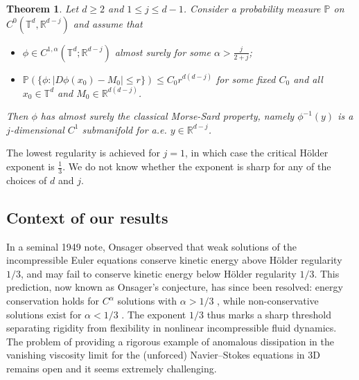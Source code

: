 \documentclass[11pt,reqno]{amsart}
\newtheorem{theorem}{Theorem}[section]
\theoremstyle{definition}
\numberwithin{equation}{section}
\begin{document}
\begin{theorem}\label{t:classical-Morse-Sard}
Let $d\geq 2$ and $1\leq j \leq d-1$. Consider a probability measure $\mathbb P$ on $C^0 (\mathbb T^d, \mathbb R^{d-j})$ and assume that 
\begin{itemize}
\item[(a)] $\phi \in C^{1,\alpha} (\mathbb{T}^d; \mathbb{R}^{d-j})$ almost surely for some $\alpha>\frac{j}{2+j}$;
\item[(b)] $\mathbb P (\{\phi : |D\phi (x_0) - M_0| \leq r \}) \leq C_0 r^{d(d-j)}$ for some fixed $C_0$ and all $x_0\in \mathbb T^d$ and $M_0 \in \mathbb R^{d(d-j)}$.
\end{itemize}
Then $\phi$ has almost surely the classical Morse-Sard property, namely $\phi^{-1} (y)$ is a $j$-dimensional $C^1$ submanifold for a.e. $y\in \mathbb R^{d-j}$. 
\end{theorem}

The lowest regularity is achieved for $j=1$, in which case the critical H\"older exponent is $\frac{1}{3}$. We do not know whether the exponent is sharp for any of the choices of $d$ and $j$.

\subsection{Context of our results} In a seminal 1949 note, Onsager \cite{Onsager1949} observed that weak solutions of the incompressible Euler equations conserve kinetic energy above H\"older regularity $1/3$, and may fail to conserve kinetic energy below H\"older regularity $1/3$. This prediction, now known as Onsager's conjecture, has since been resolved: energy conservation holds for $C^\alpha$ solutions with $\alpha>1/3$ \cite{Eyink1994, ConstantinETiti1994,DuchonRobert2000,CheskidovConstantinFriedlanderShvydkoy2008}, while non-conservative solutions exist for $\alpha<1/3$ \cite{DeLellisSzekelyhidi2009,DeLellisSzekelyhidi2010,DeLellisSzekelyhidi2013,BuckmasterDeLellisIsettSzekelyhidi2015, Isett2018, BuckmasterDeLellisSzekelyhidiVicol2019}. 
The exponent $1/3$ thus marks a sharp threshold separating rigidity from flexibility in nonlinear  incompressible fluid dynamics. The problem of providing a rigorous example of anomalous dissipation in the vanishing viscosity limit for the (unforced) Navier--Stokes equations in 3D remains open and it seems extremely challenging. 
\end{document}
